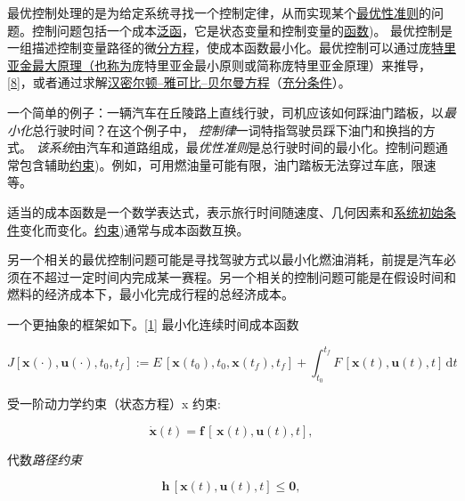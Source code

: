 最优控制处理的是为给定系统寻找一个控制定律，从而实现某个\href{https://en.wikipedia.org/wiki/Optimality_criterion}{最优性准则}的问题。控制问题包括一个成本\href{https://en.wikipedia.org/wiki/Cost_functional}{泛函}，它是状态变量和控制变量的\href{https://en.wikipedia.org/wiki/Function_(mathematics}{函数})。 最优控制是一组描述控制变量路径的微\href{https://en.wikipedia.org/wiki/Differential_equation}{分方程}，使成本函数最小化。最优控制可以通过庞\href{https://en.wikipedia.org/wiki/Pontryagin's_maximum_principle}{特里亚金最大原理}\href{https://en.wikipedia.org/wiki/Necessary_condition}{（也称为}庞特里亚金最小原则或简称庞特里亚金原理）来推导，\href{https://en.wikipedia.org/wiki/Optimal_control#cite_note-8}{[8]}，或者通过求解\href{https://en.wikipedia.org/wiki/Hamilton–Jacobi–Bellman_equation}{汉密尔顿–雅可比–贝尔曼方程}（\href{https://en.wikipedia.org/wiki/Sufficient_condition}{充分条件}）。

一个简单的例子：一辆汽车在丘陵路上直线行驶，司机应该如何踩油门踏板，以\emph{最小化}总行驶时间？在这个例子中， \emph{控制律}一词特指驾驶员踩下油门和换挡的方式。 \emph{该系统}由汽车和道路组成，最\emph{优性准则}是总行驶时间的最小化。控制问题通常包含辅助\href{https://en.wikipedia.org/wiki/Constraint_(mathematics}{约束})。例如，可用燃油量可能有限，油门踏板无法穿过车底，限速等。

适当的成本函数是一个数学表达式，表示旅行时间随速度、几何因素和\href{https://en.wikipedia.org/wiki/Initial_condition}{系统初始条件}变化而变化。\href{https://en.wikipedia.org/wiki/Constraint_(mathematics}{约束})通常与成本函数互换。

另一个相关的最优控制问题可能是寻找驾驶方式以最小化燃油消耗，前提是汽车必须在不超过一定时间内完成某一赛程。另一个相关的控制问题可能是在假设时间和燃料的经济成本下，最小化完成行程的总经济成本。

一个更抽象的框架如下。\href{https://en.wikipedia.org/wiki/Optimal_control#cite_note-:0-1}{[1]} 最小化连续时间成本函数

\[
{\displaystyle J[{\textbf {x}}(\cdot ),{\textbf {u}}(\cdot ),t_{0},t_{f}]:=E\,[{\textbf {x}}(t_{0}),t_{0},{\textbf {x}}(t_{f}),t_{f}]+\int _{t_{0}}^{t_{f}}F\,[{\textbf {x}}(t),{\textbf {u}}(t),t]\,\mathrm {d} t}
\]

受一阶动力学约束（状态方程）x 约束:

\[
{\displaystyle {\dot {\textbf {x}}}(t)={\textbf {f}}\,[\,{\textbf {x}}(t),{\textbf {u}}(t),t],}
\]

代数\emph{路径约束}

\[
{\displaystyle {\textbf {h}}\,[{\textbf {x}}(t),{\textbf {u}}(t),t]\leq {\textbf {0}},}
\]

